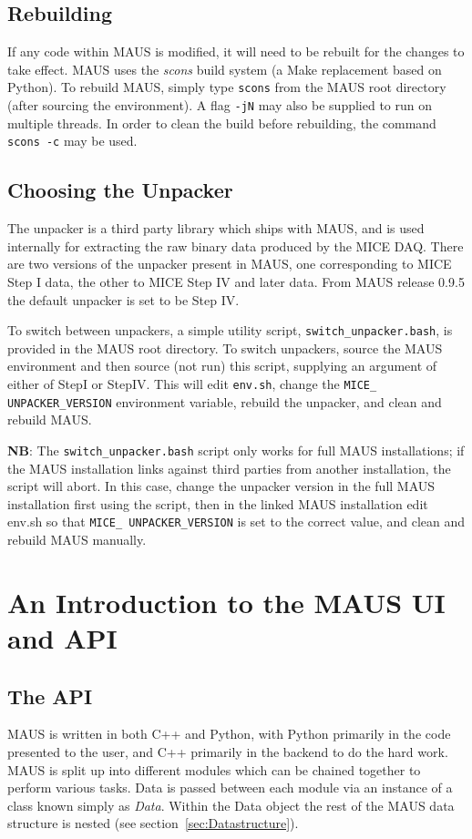 \documentclass[a4paper,10pt]{article}
\begin{document}
  \subsection{Rebuilding}
  If any code within MAUS is modified, it will need to be rebuilt for the changes to take effect. MAUS uses the \textit{scons} build system (a Make replacement based on Python). To rebuild MAUS, simply type \texttt{scons} from the MAUS root directory (after sourcing the environment). A flag \texttt{-jN} may also be supplied to run on multiple threads. In order to clean the build before rebuilding, the command \texttt{scons -c} may be used.
  
  \subsection{Choosing the Unpacker}
  The unpacker is a third party library which ships with MAUS, and is used internally for extracting the raw binary data produced by the MICE DAQ. There are two versions of the unpacker present in MAUS, one corresponding to MICE Step I data, the other to MICE Step IV and later data. From MAUS release 0.9.5 the default unpacker is set to be Step IV.

  To switch between unpackers, a simple utility script, \texttt{switch\_unpacker.bash}, is provided in the MAUS root directory. To switch unpackers, source the MAUS environment and then source (not run) this script, supplying an argument of either of StepI or StepIV. This will edit \texttt{env.sh}, change the \texttt{MICE\_ UNPACKER\_VERSION} environment variable, rebuild the unpacker, and clean and rebuild MAUS.

  \textbf{NB}: The \texttt{switch\_unpacker.bash} script only works for full MAUS installations; if the MAUS installation links against third parties from another installation, the script will abort.  In this case, change the unpacker version in the full MAUS installation first using the script, then in the linked MAUS installation edit env.sh so that \texttt{MICE\_ UNPACKER\_VERSION} is set to the correct value, and clean and rebuild MAUS manually.

\section{An Introduction to the MAUS UI and API}
\label{sec:API}
  \subsection{The API}
    MAUS is written in both C++ and Python, with Python primarily in the code presented to the user, and C++ primarily in the backend to do the hard work.  MAUS is split up into different modules which can be chained together to perform various tasks. Data is passed between each module via an instance of a class known simply as \textit{Data}. Within the Data object the rest of the MAUS data structure is nested (see section~\ref{sec:Datastructure}). 
\end{document}
